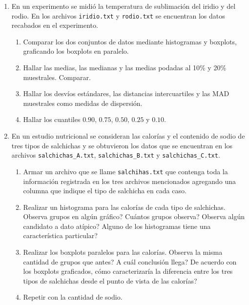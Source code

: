 \documentclass[12pt]{article}%
\def \sp {\textquestiondown}
\begin{document}
\begin{enumerate}
\item En un experimento se midi\'o la temperatura de sublimaci\'{o}n del
iridio y del rodio. En los archivos \texttt{iridio.txt} y \texttt{rodio.txt} se encuentran los datos recabados en el experimento.
\begin{enumerate}
\item Comparar los dos conjuntos de datos mediante histogramas y boxplots, graficando los boxplots en paralelo.
\item Hallar las medias, las medianas y las medias podadas al 10\% y 20\% muestrales. Comparar.
\item Hallar los desv\'ios est\'andares, las distancias intercuartiles y las MAD muestrales
como medidas de dispersi\'on.
\item Hallar los cuantiles $0.90$, $0.75$, $0.50$, $0.25$ y $0.10$.
\end{enumerate}

\item En un estudio nutricional se consideran las calor\'ias y el
contenido de sodio de tres tipos de salchichas y se obtuvieron los datos que
se encuentran en los archivos \texttt{salchichas\_A.txt}, \texttt{salchichas\_B.txt} y \texttt{salchichas\_C.txt}.
\begin{enumerate}
\item Armar un archivo que se llame \texttt{salchihas.txt} que contenga toda la información registrada en los tres archivos mencionados agregando una columna que indique el tipo de salchicha en cada caso.	
\item Realizar un histograma para las calor\'ias de cada tipo de salchichas.
\sp Observa grupos en alg\'un gr\'afico?
\sp Cu\'antos grupos observa? \sp Observa alg\'un candidato a dato at\'ipico? \sp Alguno de los histogramas tiene una caracter\'istica particular? %
\item Realizar los boxplots paralelos para las calor\'ias.
\sp Observa la misma cantidad de grupos que antes?
\sp A cu\'al conclusi\'on llega? De acuerdo con los boxplots graficados, \sp c\'omo caracterizar\'ia la diferencia entre los tres tipos de salchichas desde el punto de vista de las calor\'ias?
\item Repetir con la cantidad de sodio.

\end{enumerate}


\end{enumerate}
\end{document}
